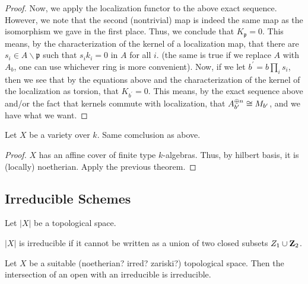 \begin{proof}
	Now, we apply the localization functor to the above
	exact sequence. 
	However, we note that the second (nontrivial) map
	is indeed the same map as the isomorphism we
	gave in the first place.
	Thus, we conclude that \(K_{\mathfrak{p}} = 0\).
	This means, by the characterization
	of the kernel of a localization map,
	that there are \(s_{i} \in A \smallsetminus \mathfrak{p}\) 
	such that \(s_{i}k_{i} = 0\) in \(A\) for all \(i\).
	(the same is true if we replace  \(A\) with \(A_{b}\),
	one can use whichever ring is more convenient).
	Now, if we let 
	\(b^{\prime} = b \prod_{i}^{} s_{i} \),
	then we see that by the equations above
	and the characterization of the kernel of the localization
	as torsion, that
	\(K_{b^{\prime}} = 0\).
	This means, by the exact sequence above and/or the fact
	that kernels commute with localization,
	that \(A_{b^{\prime}}^{\oplus n} \cong M_{b^{\prime}}\),
	and we have what we want.
	
\end{proof}

\begin{corollary}
  \label{cor:fintype_stalk_free_implies_locally_free}
  Let $X$ be a variety over $k$.
  Same comclusion as above.
\end{corollary}

\begin{proof}
  $X$ has an affine cover of finite type $k$-algebras.
  Thus, by hilbert basis, it is (locally) noetherian.
  Apply the previous theorem.
\end{proof}

\subsection{Irreducible Schemes}

Let $|X|$ be a topological space.

\begin{definition}
  \label{def:irred_top_space}
  $|X|$ is irreducible if it cannot be written as a
  union of two closed subsets $ Z_1 \cup \mathbf{Z}_2$.
\end{definition}

\begin{lemma}
  \label{lem:irred_cap_open_is_irred_top_space}
  Let $X$ be a suitable (noetherian? irred? zariski?)
  topological space. 
  Then the intersection of an open with an irreducible is irreducible.
\end{lemma}

